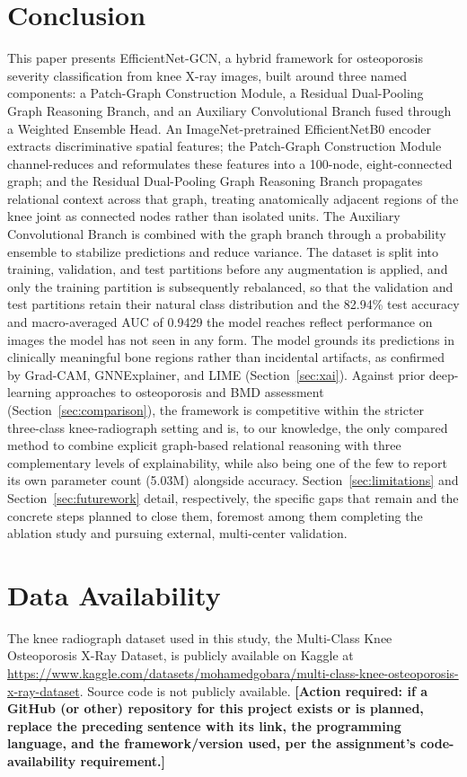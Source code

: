 \documentclass[conference]{IEEEtran}
\begin{document}
\section{Conclusion} \label{conclusion}
This paper presents EfficientNet-GCN, a hybrid framework for osteoporosis severity classification from knee X-ray images, built around three named components: a Patch-Graph Construction Module, a Residual Dual-Pooling Graph Reasoning Branch, and an Auxiliary Convolutional Branch fused through a Weighted Ensemble Head. An ImageNet-pretrained EfficientNetB0 encoder extracts discriminative spatial features; the Patch-Graph Construction Module channel-reduces and reformulates these features into a 100-node, eight-connected graph; and the Residual Dual-Pooling Graph Reasoning Branch propagates relational context across that graph, treating anatomically adjacent regions of the knee joint as connected nodes rather than isolated units. The Auxiliary Convolutional Branch is combined with the graph branch through a probability ensemble to stabilize predictions and reduce variance. The dataset is split into training, validation, and test partitions before any augmentation is applied, and only the training partition is subsequently rebalanced, so that the validation and test partitions retain their natural class distribution and the 82.94\% test accuracy and macro-averaged AUC of 0.9429 the model reaches reflect performance on images the model has not seen in any form. The model grounds its predictions in clinically meaningful bone regions rather than incidental artifacts, as confirmed by Grad-CAM, GNNExplainer, and LIME (Section~\ref{sec:xai}). Against prior deep-learning approaches to osteoporosis and BMD assessment (Section~\ref{sec:comparison}), the framework is competitive within the stricter three-class knee-radiograph setting and is, to our knowledge, the only compared method to combine explicit graph-based relational reasoning with three complementary levels of explainability, while also being one of the few to report its own parameter count (5.03M) alongside accuracy. Section~\ref{sec:limitations} and Section~\ref{sec:futurework} detail, respectively, the specific gaps that remain and the concrete steps planned to close them, foremost among them completing the ablation study and pursuing external, multi-center validation.

\section*{Data Availability}
The knee radiograph dataset used in this study, the Multi-Class Knee Osteoporosis X-Ray Dataset, is publicly available on Kaggle \cite{gobara2024multiclass} at \url{https://www.kaggle.com/datasets/mohamedgobara/multi-class-knee-osteoporosis-x-ray-dataset}. Source code is not publicly available. \textbf{[Action required: if a GitHub (or other) repository for this project exists or is planned, replace the preceding sentence with its link, the programming language, and the framework/version used, per the assignment's code-availability requirement.]}




\end{document}
